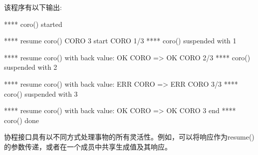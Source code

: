 该程序有以下输出:

\begin{shell}
**** coro() started

**** resume coro()
         CORO 3 start
         CORO 1/3
**** coro() suspended with 1

**** resume coro() with back value: OK
         CORO => OK
         CORO 2/3
**** coro() suspended with 2

**** resume coro() with back value: ERR
         CORO => ERR
         CORO 3/3
**** coro() suspended with 3

**** resume coro() with back value: OK
         CORO => OK
         CORO 3 end
**** coro() done
\end{shell}

协程接口具有以不同方式处理事物的所有灵活性。例如，可以将响应作为resume()的参数传递，或者在一个成员中共享生成值及其响应。










